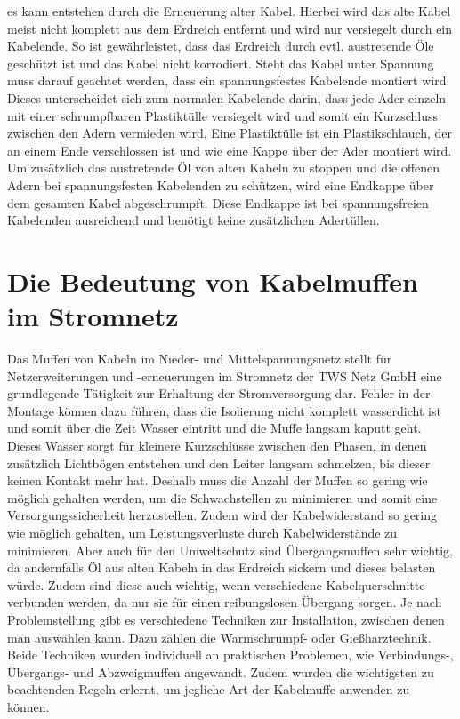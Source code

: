 es kann entstehen durch die Erneuerung alter Kabel. Hierbei wird das alte Kabel meist nicht komplett aus dem Erdreich entfernt und wird nur versiegelt durch 
ein Kabelende. So ist gewährleistet, dass das Erdreich durch evtl. austretende Öle geschützt ist und das Kabel nicht korrodiert. Steht das Kabel unter 
Spannung muss darauf geachtet werden, dass ein spannungsfestes Kabelende montiert wird. Dieses unterscheidet sich zum normalen Kabelende darin, dass jede 
Ader einzeln mit einer schrumpfbaren Plastiktülle versiegelt wird und somit ein Kurzschluss zwischen den Adern vermieden wird. Eine Plastiktülle ist ein 
Plastikschlauch, der an einem Ende verschlossen ist und wie eine Kappe über der Ader montiert wird. Um zusätzlich das austretende Öl von alten Kabeln zu 
stoppen und die offenen Adern bei \zB spannungsfesten Kabelenden zu schützen, wird eine Endkappe über dem gesamten Kabel abgeschrumpft. Diese Endkappe ist 
bei spannungsfreien Kabelenden ausreichend und benötigt keine zusätzlichen Adertüllen. \autocite{Cellpack}

\clearpage

\section{Die Bedeutung von Kabelmuffen im Stromnetz}

Das Muffen von Kabeln im Nieder- und Mittelspannungsnetz stellt für Netzerweiterungen und -erneuerungen im Stromnetz der TWS Netz GmbH eine grundlegende 
Tätigkeit zur Erhaltung der Stromversorgung dar. Fehler in der Montage können dazu führen, dass die Isolierung nicht komplett wasserdicht ist und somit über 
die Zeit Wasser eintritt und die Muffe langsam kaputt geht. Dieses Wasser sorgt für kleinere Kurzschlüsse zwischen den Phasen, in denen zusätzlich 
Lichtbögen entstehen und den Leiter langsam schmelzen, bis dieser keinen Kontakt mehr hat. Deshalb muss die Anzahl der Muffen so gering wie möglich gehalten 
werden, um die Schwachstellen zu minimieren und somit eine Versorgungssicherheit herzustellen. 
Zudem wird der Kabelwiderstand so gering wie möglich gehalten, um Leistungsverluste durch Kabelwiderstände zu minimieren. Aber auch für den 
Umweltschutz sind \zB Übergangsmuffen sehr wichtig, da andernfalls Öl aus alten Kabeln in das Erdreich sickern und dieses belasten würde. Zudem sind diese 
auch wichtig, wenn verschiedene Kabelquerschnitte verbunden werden, da nur sie für einen reibungslosen Übergang sorgen. Je nach Problemstellung gibt es 
verschiedene Techniken zur Installation, zwischen denen man auswählen kann. Dazu zählen die Warmschrumpf- oder Gießharztechnik. Beide Techniken wurden 
individuell an praktischen Problemen, wie \zB Verbindungs-, Übergangs- und Abzweigmuffen angewandt. Zudem wurden die wichtigsten zu beachtenden Regeln 
erlernt, um jegliche Art der Kabelmuffe anwenden zu können.
\clearpage

